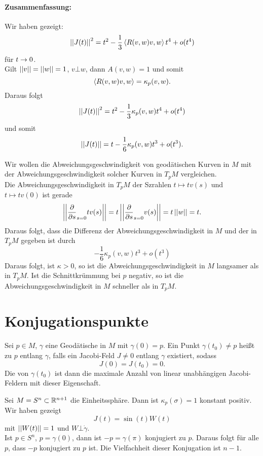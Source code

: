 \paragraph{Zusammenfassung:} Wir haben gezeigt:
\[ \left|\left|J(t)\right|\right|^2 = t^2 - \frac{1}{3} \left< 
R(v,w)v, w
 \right> t^4
+ o(t^4) \]
für $t \overset{}{\rightarrow} 0$.\\

Gilt $\left|\left|v\right|\right| = \left|\left|w\right|\right| = 1$, $v\bot w$, dann $A(v,w) = 1$ und somit
\[ \left<R(v,w)v, w\right> = \kappa_p(v,w). \]
Daraus folgt
\[ \left|\left|J(t)\right|\right|^2 = t^2 - \frac{1}{3} \kappa_p(v,w)t^4 + o(t^4) \]
und somit
\[ \left|\left|J(t)\right|\right|= t - \frac{1}{6} \kappa_p(v,w)t^3 + o(t^3). \]


Wir wollen die Abweichungsgeschwindigkeit von geodätischen Kurven in $M$ mit der Abweichungsgeschwindigkeit solcher Kurven in $T_pM$ vergleichen.\\
Die Abweichungsgeschwindigkeit in $T_pM$ der Szrahlen $t \mapsto tv(s)$ und $t\mapsto tv(0)$ ist gerade
\[ \left|\left| \frac{\partial }{\partial s}_{s=0 }tv(s)\right|\right| = t \left|\left| \frac{\partial }{\partial s}_{s = 0 } v(s) \right|\right| = t\left|\left|w\right|\right| = t. \]
Daraus folgt, dass die Differenz der Abweichungsgeschwindigkeit in $M$ und der in $T_pM$ gegeben ist durch
\[ - \frac{1}{6}\kappa_p(v,w)t^3  + o(t^3) \]
Daraus folgt, ist $\kappa > 0$, so ist die Abweichungsgeschwindigkeit in $M$ langsamer als in $T_pM$. Ist die Schnittkrümmung bei $p$ negativ, so ist die Abweichungsgeschwindigkeit in $M$ schneller als in $T_pM$.

\newpage
\section{Konjugationspunkte}
\Def{}
Sei $p \in M$, $\gamma$ eine Geodätische in $M$ mit $\gamma(0) = p$. Ein Punkt $\gamma(t_0)\neq p$ heißt  zu $p$ entlang $\gamma$, falls ein Jacobi-Feld $J\neq 0$ entlang $\gamma$ existiert, sodass 
\[J(0) = J(t_0) = 0.\]
Die  von $\gamma(t_0)$ ist dann die maximale Anzahl von linear unabhängigen Jacobi-Feldern mit dieser Eigenschaft.

\Bsp{}
Sei $ M = S^n \subset \mathbb{R}^{n+1}$ die Einheitssphäre. Dann ist $\kappa_p(\sigma) = 1$ konstant positiv.\\
Wir haben gezeigt
\[ J(t) = \sin(t) W(t) \]
mit $\left|\left|W(t)\right|\right| = 1$ und $W\bot \dot{\gamma}.$\\
Ist $p \in S^n$, $p = \gamma(0)$, dann ist $-p = \gamma(\pi)$ konjugiert zu $p$. Daraus folgt für alle $p$, dass $-p$ konjugiert zu $p$ ist. Die Vielfachheit dieser Konjugation ist $n-1$.

